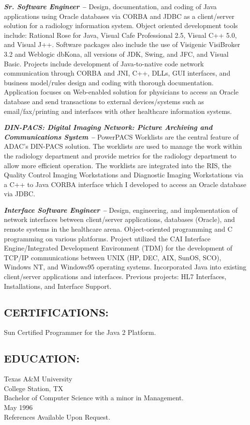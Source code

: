 \documentclass[10pt]{report}
\begin{document}
  \begin{description}

    \item{\bf{\emph{Sr. Software Engineer -- }}} Design, documentation, and
    coding of Java applications using Oracle databases via CORBA and JDBC as a
    client/server solution for a radiology information system. Object oriented
    development tools include: Rational Rose for Java, Visual Cafe Professional
    2.5, Visual C++ 5.0, and Visual J++.  Software packages also include the use
    of Visigenic VisiBroker 3.2 and Weblogic dbKona, all versions of JDK, Swing,
    and JFC, and Visual Basic.  Projects include development of Java-to-native
    code network communication through CORBA and JNI, C++, DLLs, GUI interfaces,
    and business model/rules design and coding with thorough documentation.
    Application focuses on Web-enabled solution for physicians to access an
    Oracle database and send transactions to external devices/systems such as
    email/fax/printing and interfaces with other healthcare information systems.

    \item{\bf{\emph{DIN-PACS: Digital Imaging Network: Picture Archiving and
    Communications System --}}} PowerPACS Worklists are the central feature of
    ADAC's DIN-PACS solution. The worklists are used to manage the work within
    the radiology department and provide metrics for the radiology department to
    allow more efficient operation.  The worklists are integrated into the RIS,
    the Quality Control Imaging Workstations and Diagnostic Imaging Workstations
    via a C++ to Java CORBA interface which I developed to access an Oracle
    database via JDBC.

    \item{\bf{\emph{Interface Software Engineer --}}} Design, engineering, and
    implementation of network interfaces between client/server applications,
    databases (Oracle), and remote systems in the healthcare arena.
    Object-oriented programming and C programming on various platforms.  Project
    utilized the CAI Interface Engine/Integrated Development Environment (TDM)
    for the development of TCP/IP communications between UNIX (HP, DEC, AIX,
    SunOS, SCO), Windows NT, and Windows95 operating systems.  Incorporated Java
    into existing client/server applications and interfaces.  Previous projects:
    HL7 Interfaces, Installations, and Interface Support.

  \end{description}

\subsection*{CERTIFICATIONS:}
Sun Certified Programmer for the Java 2 Platform.

\subsection*{EDUCATION:}
Texas A\&M University \\
College Station, TX \\
Bachelor of Computer Science with a minor in Management. \\
May 1996 \\

References Available Upon Request.
\end{document}

